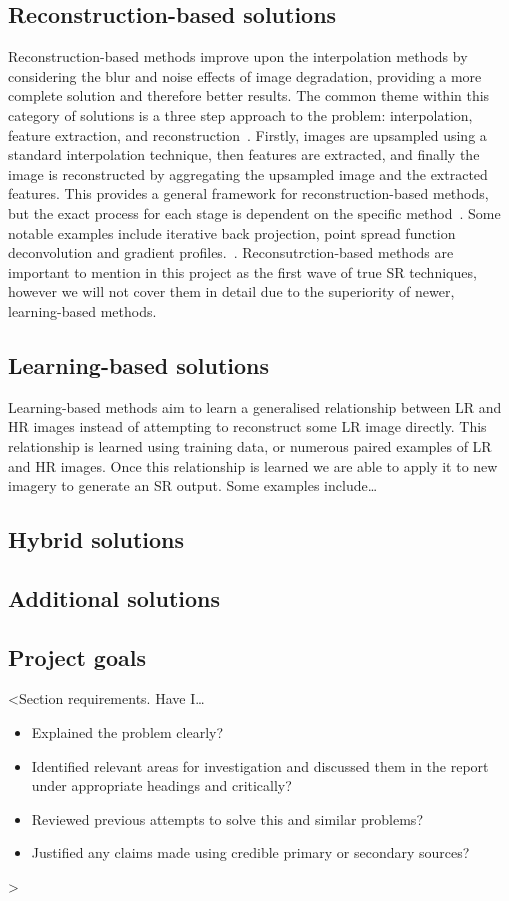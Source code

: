 \subsection{Reconstruction-based solutions}
Reconstruction-based methods improve upon the interpolation methods by considering the blur and noise effects of image degradation, providing a more complete solution and therefore better results. The common theme within this category of solutions is a three step approach to the problem: interpolation, feature extraction, and reconstruction~\cite{superResRemoteSensingOverview}. Firstly, images are upsampled using a standard interpolation technique, then features are extracted, and finally the image is reconstructed by aggregating the upsampled image and the extracted features. This provides a general framework for reconstruction-based methods, but the exact process for each stage is dependent on the specific method~\cite{superResRemoteSensingOverview}. Some notable examples include iterative back projection, point spread function deconvolution and gradient profiles.~\cite{superResRemoteSensingOverview}. Reconsutrction-based methods are important to mention in this project as the first wave of true SR techniques, however we will not cover them in detail due to the superiority of newer, learning-based methods.

\subsection{Learning-based solutions}
Learning-based methods aim to learn a generalised relationship between LR and HR images instead of attempting to reconstruct some LR image directly. This relationship is learned using training data, or numerous paired examples of LR and HR images. Once this relationship is learned we are able to apply it to new imagery to generate an SR output. Some examples include\dots

\subsection{Hybrid solutions}

\subsection{Additional solutions}

\subsection{Project goals}

<Section requirements. Have I\dots
\begin{itemize}
    \item Explained the problem clearly?
    \item Identified relevant areas for investigation and discussed them in the report under appropriate headings and critically?
    \item Reviewed previous attempts to solve this and similar problems?
    \item Justified any claims made using credible primary or secondary sources?
\end{itemize}
>